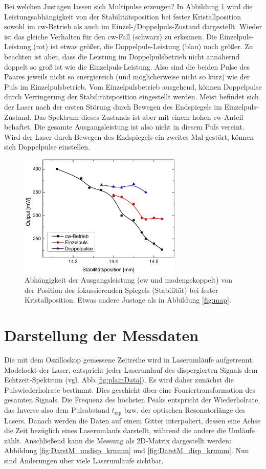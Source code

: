 \documentclass[bachelor,       %
               twoside,        %
               BCOR10mm,       %
               liststotoc,nomtotoc,bibtotoc, %
               english,ngerman, %
               final,          %
               ]{GAUBM}
\begin{document}
Bei welchen Justagen lassen sich Multipulse erzeugen?
In Abbildung \ref{fig:map2} wird die Leistungsabhängigkeit von der Stabilitätsposition bei fester Kristallposition sowohl im cw-Betrieb als auch im Einzel-/Doppelpuls-Zustand  dargestellt.
Wieder ist das gleiche Verhalten für den cw-Fall (schwarz) zu erkennen.
Die Einzelpuls-Leistung (rot) ist etwas größer, die Doppelpuls-Leistung (blau) noch größer.
Zu beachten ist aber, dass die Leistung im Doppelpulsbetrieb nicht annähernd doppelt so groß ist wie die Einzelpuls-Leistung.
Also sind die beiden Pulse des Paares jeweils nicht so energiereich (und möglicherweise nicht so kurz) wie der Puls im Einzelpulsbetrieb.
Vom Einzelpulsbetrieb ausgehend, können Doppelpulse durch Verringerung der Stabilitätsposition eingestellt werden.
Meist befindet sich der Laser nach der ersten Störung durch Bewegen des Endspiegels  im Einzelpuls-Zustand.
Das Spektrum dieses Zustands ist aber mit einem hohen cw-Anteil behaftet.
Die gesamte Ausgangsleistung ist also nicht in diesem Puls vereint.
Wird der Laser durch Bewegen des Endspiegels ein zweites Mal gestört, können sich Doppelpulse einstellen.

\begin{figure}[!htb]
	\centering
	\includegraphics[width=0.69\textwidth]{figures/map2.pdf}
	\caption{Abhängigkeit der Ausgangsleistung (cw und modengekoppelt) von der Position des fokussierenden Spiegels (Stabilität) bei fester Kristallposition.
	Etwas andere Justage als in Abbildung \ref{fig:map}.}
	\label{fig:map2}
\end{figure}


\section{Darstellung der Messdaten}
Die mit dem Oszilloskop  gemessene Zeitreihe wird in Laserumläufe aufgetrennt.
Modelockt der Laser, entspricht jeder Laserumlauf des dispergierten Signals dem Echtzeit-Spektrum (vgl. Abb.\ref{fig:plainData}).
Es wird daher zunächst die Pulswiederholrate bestimmt.
Dies geschieht über eine Fouriertransformation des gesamten Signals.
Die Frequenz des höchsten Peaks entspricht der Wiederholrate, das Inverse also dem Pulsabstand $t_\text{rep}$ bzw. der optischen Resonatorlänge des Lasers.
Danach werden die Daten auf einem Gitter interpoliert, dessen eine Achse die Zeit bezüglich eines Laserumlaufs darstellt, während die andere die Umläufe zählt.
Anschließend kann die Messung als 2D-Matrix dargestellt werden: Abbildung \ref{fig:DarstM_undisp_krumm} und \ref{fig:DarstM_disp_krumm}.
Nun sind Änderungen über viele Laserumläufe sichtbar.
\end{document}
